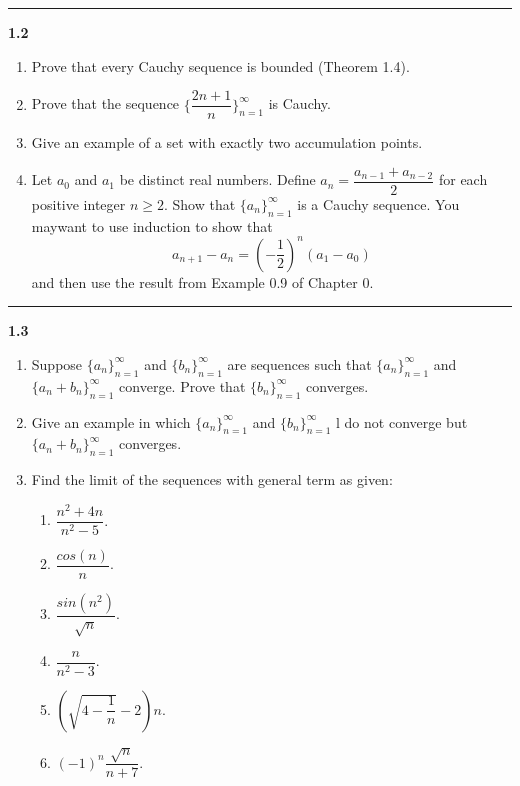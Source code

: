 \documentclass[fleqn]{article}
\begin{document}
  \rule{15cm}{2pt}

  \textbf{1.2}
  \begin{enumerate}
    \item Prove that every Cauchy sequence is bounded (Theorem 1.4).

    \item Prove that the sequence $\{\dfrac{2n+1}{n}\}_{n=1}^{\infty}$ is Cauchy.

    \item Give an example of a set with exactly two accumulation points.

    \item Let $a_0$ and $a_1$ be distinct real numbers. Define $a_n=\dfrac{a_{n-1}+a_{n-2}}{2}$ for each positive integer
    $n \geqslant 2$. Show that $\{a_n\}_{n=1}^{\infty}$ is a Cauchy sequence. You maywant to use induction to show that
    $$
      a_{n+1}-a_n=\left(-\dfrac{1}{2}\right)^n \left(a_1-a_0\right)
    $$
    and then use the result from Example 0.9 of Chapter 0.
  \end{enumerate}

  \rule{15cm}{2pt}

  \textbf{1.3}
  \begin{enumerate}
    \item Suppose $\{a_n\}_{n=1}^{\infty}$ and $\{b_n\}_{n=1}^{\infty}$ are sequences such that $\{a_n\}_{n=1}^{\infty}$
    and $\{a_n+b_n\}_{n=1}^{\infty}$ converge. Prove that $\{b_n\}_{n=1}^{\infty}$ converges.

    \item Give an example in which $\{a_n\}_{n=1}^{\infty}$ and $\{b_n\}_{n=1}^{\infty}$ l do not converge but 
    $\{a_n+b_n\}_{n=1}^{\infty}$ converges.


    \item Find the limit of the sequences with general term as given:
    \begin{enumerate}
      \item $\dfrac{n^2+4n}{n^2-5}$.

      \item $\dfrac{cos(n)}{n}$.
      
      \item $\dfrac{sin(n^2)}{\sqrt{n}}$.
      
      \item $\dfrac{n}{n^2-3}$.
      
      \item $\left(\sqrt{4-\dfrac{1}{n}}-2\right)n$.

      \item $(-1)^n \dfrac{\sqrt{n}}{n+7}$.
    \end{enumerate}

  \end{enumerate}
\end{document}
